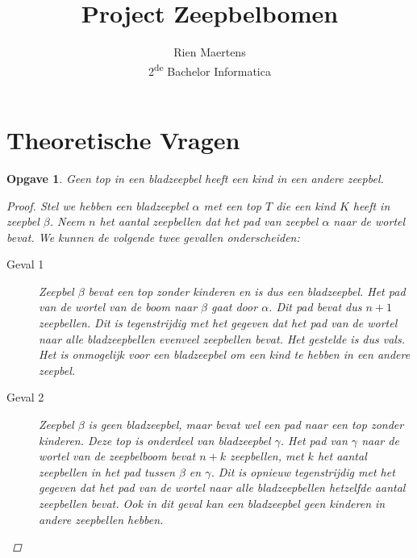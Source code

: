 \documentclass[12pt,hidelinks]{article}
\author{Rien Maertens\\
    2\textsuperscript{de} Bachelor Informatica}
\title{Project Zeepbelbomen}
\newtheorem{opgave}{Opgave}
\begin{document}
    \maketitle
    \newpage
    \part{Theoretische Vragen}
    \begin{opgave}
        Geen top in een bladzeepbel heeft een kind in een andere zeepbel.
        \begin{proof}
            Stel we hebben een bladzeepbel $\alpha$ met een top $T$ die een kind $K$ heeft in zeepbel $\beta$. 
            Neem $n$ het aantal zeepbellen dat het pad van zeepbel $\alpha$ naar de wortel bevat. 
            We kunnen de volgende twee gevallen onderscheiden:
            \begin{description}
                \item[Geval 1] Zeepbel $\beta$ bevat een top zonder kinderen en is dus een bladzeepbel.
                    Het pad van de wortel van de boom naar $\beta$ gaat door $\alpha$.
                    Dit pad bevat dus $n+1$ zeepbellen. Dit is tegenstrijdig met het gegeven dat het pad van de wortel naar alle bladzeepbellen evenveel zeepbellen bevat.
                    Het gestelde is dus vals. Het is onmogelijk voor een bladzeepbel om een kind te hebben in een andere zeepbel.
                \item[Geval 2] Zeepbel $\beta$ is geen bladzeepbel, maar bevat wel een pad naar een top zonder kinderen.
                    Deze top is onderdeel van bladzeepbel $\gamma$.
                    Het pad van $\gamma$ naar de wortel van de zeepbelboom bevat $n+k$ zeepbellen, met $k$ het aantal zeepbellen in het pad tussen $\beta$ en $\gamma$.
                    Dit is opnieuw tegenstrijdig met het gegeven dat het pad van de wortel naar alle bladzeepbellen hetzelfde aantal zeepbellen bevat.
                    Ook in dit geval kan een bladzeepbel geen kinderen in andere zeepbellen hebben.
            \end{description}
        \end{proof}
    \end{opgave}
\end{document}
